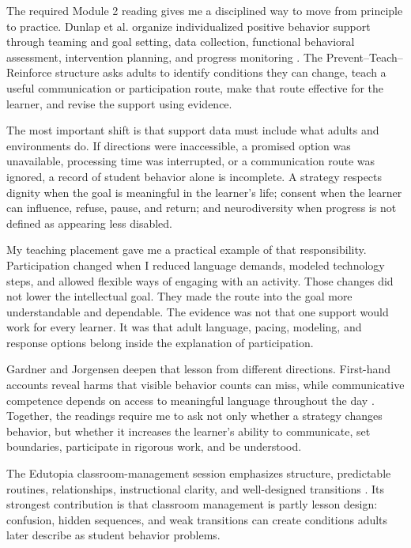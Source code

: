 
The required Module 2 reading gives me a disciplined way to move from principle to practice. Dunlap et al. organize individualized positive behavior support through teaming and goal setting, data collection, functional behavioral assessment, intervention planning, and progress monitoring \citep{dunlap2019ptr}. The Prevent--Teach--Reinforce structure asks adults to identify conditions they can change, teach a useful communication or participation route, make that route effective for the learner, and revise the support using evidence.

The most important shift is that support data must include what adults and environments do. If directions were inaccessible, a promised option was unavailable, processing time was interrupted, or a communication route was ignored, a record of student behavior alone is incomplete. A strategy respects dignity when the goal is meaningful in the learner's life; consent when the learner can influence, refuse, pause, and return; and neurodiversity when progress is not defined as appearing less disabled.

My teaching placement gave me a practical example of that responsibility. Participation changed when I reduced language demands, modeled technology steps, and allowed flexible ways of engaging with an activity. Those changes did not lower the intellectual goal. They made the route into the goal more understandable and dependable. The evidence was not that one support would work for every learner. It was that adult language, pacing, modeling, and response options belong inside the explanation of participation.

Gardner and Jorgensen deepen that lesson from different directions. First-hand accounts reveal harms that visible behavior counts can miss, while communicative competence depends on access to meaningful language throughout the day \citep{gardner2017firsthand,jorgensen2018competence}. Together, the readings require me to ask not only whether a strategy changes behavior, but whether it increases the learner's ability to communicate, set boundaries, participate in rigorous work, and be understood.


The Edutopia classroom-management session emphasizes structure, predictable routines, relationships, instructional clarity, and well-designed transitions \citep{edutopiaClassroom}. Its strongest contribution is that classroom management is partly lesson design: confusion, hidden sequences, and weak transitions can create conditions adults later describe as student behavior problems.

